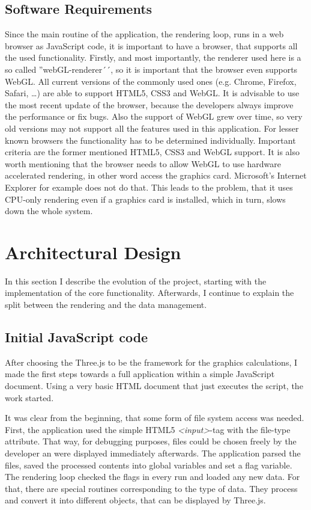 \subsection{Software Requirements} \label{SoftReq}
Since the main routine of the application, the rendering loop, runs in a web browser as JavaScript code, it is important to have a browser, that supports all the used functionality. Firstly, and most importantly, the renderer used here is a so called ''webGL-renderer´´, so it is important that the browser even supports WebGL. All current versions of the commonly used ones (e.g. Chrome, Firefox, Safari, \ldots) are able to support HTML5, CSS3 and WebGL. It is advisable to use the most recent update of the browser, because the developers always improve the performance or fix bugs. Also the support of WebGL grew over time, so very old versions may not support all the features used in this application. For lesser known browsers the functionality has to be determined individually. Important criteria are the former mentioned HTML5, CSS3 and WebGL support. It is also worth mentioning that the browser needs to allow WebGL to use hardware accelerated rendering, in other word access the graphics card. Microsoft's Internet Explorer for example does not do that. This leads to the problem, that it uses CPU-only rendering even if a graphics card is installed, which in turn, slows down the whole system.
\section{Architectural Design}
In this section I describe the evolution of the project, starting with the implementation of the core functionality. Afterwards, I continue to explain the split between the rendering and the data management.
\subsection{Initial JavaScript code}
After choosing the Three.js to be the framework for the graphics calculations, I made the first steps towards a full application within a simple JavaScript document. Using a very basic HTML document that just executes the script, the work started.

It was clear from the beginning, that some form of file system access was needed. First, the application used the simple HTML5 \emph{<input>}-tag with the file-type attribute. That way, for debugging purposes, files could be chosen freely by the developer an were displayed immediately afterwards. The application parsed the files, saved the processed contents into global variables and set a flag variable. The rendering loop checked the flags in every run and loaded any new data. For that, there are special routines corresponding to the type of data. They process and convert it into different objects, that can be displayed by Three.js.

